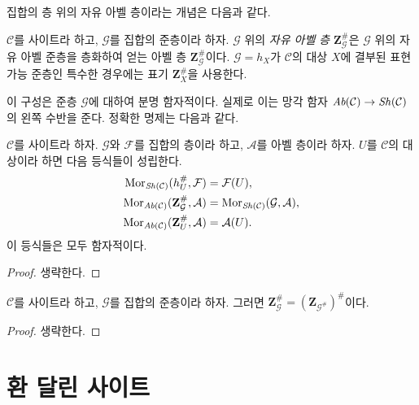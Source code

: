 \noindent
집합의 층 위의 자유 아벨 층이라는 개념은 다음과 같다.

\begin{definition}
\label{definition-free-abelian-sheaf-on}
$\mathcal{C}$를 사이트라 하고, $\mathcal{G}$를 집합의 준층이라 하자.
$\mathcal{G}$ 위의 {\it 자유 아벨 층} $\mathbf{Z}_\mathcal{G}^\#$은
$\mathcal{G}$ 위의 자유 아벨 준층을 층화하여 얻는 아벨 층
$\mathbf{Z}_\mathcal{G}^\#$이다. $\mathcal{G} = h_X$가 $\mathcal{C}$의
대상 $X$에 결부된 표현가능 준층인 특수한 경우에는 표기
$\mathbf{Z}_X^\#$을 사용한다.
\end{definition}

\noindent
이 구성은 준층 $\mathcal{G}$에 대하여 분명 함자적이다. 실제로 이는 망각 함자
$\textit{Ab}(\mathcal{C}) \to \mathop{\mathit{Sh}}\nolimits(\mathcal{C})$의 왼쪽 수반을 준다.
정확한 명제는 다음과 같다.

\begin{lemma}
\label{lemma-obvious-adjointness-sheaves}
$\mathcal{C}$를 사이트라 하자. $\mathcal{G}$와 $\mathcal{F}$를 집합의
층이라 하고, $\mathcal{A}$를 아벨 층이라 하자. $U$를 $\mathcal{C}$의
대상이라 하면 다음 등식들이 성립한다.
\begin{align*}
\mathop{\mathrm{Mor}}\nolimits_{\mathop{\mathit{Sh}}\nolimits(\mathcal{C})}(h_U^\#, \mathcal{F})
& =
\mathcal{F}(U), \\
\mathop{\mathrm{Mor}}\nolimits_{\textit{Ab}(\mathcal{C})}(\mathbf{Z}_\mathcal{G}^\#,
\mathcal{A})
& =
\mathop{\mathrm{Mor}}\nolimits_{\mathop{\mathit{Sh}}\nolimits(\mathcal{C})}(\mathcal{G}, \mathcal{A}), \\
\mathop{\mathrm{Mor}}\nolimits_{\textit{Ab}(\mathcal{C})}(\mathbf{Z}_U^\#, \mathcal{A})
& =
\mathcal{A}(U).
\end{align*}
이 등식들은 모두 함자적이다.
\end{lemma}

\begin{proof}
생략한다.
\end{proof}

\begin{lemma}
\label{lemma-may-sheafify-before-abelianize}
$\mathcal{C}$를 사이트라 하고, $\mathcal{G}$를 집합의 준층이라 하자.
그러면 $\mathbf{Z}_\mathcal{G}^\# = (\mathbf{Z}_{\mathcal{G}^\#})^\#$이다.
\end{lemma}

\begin{proof}
생략한다.
\end{proof}








\section{환 달린 사이트}
\label{section-ringed-sites}

